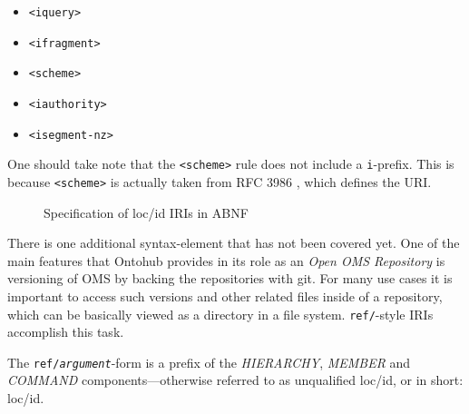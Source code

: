 \documentclass[10pt, a4paper]{isov2}
\begin{document}
\begin{itemize}
  \item \texttt{<iquery>}
  \item \texttt{<ifragment>}
  \item \texttt{<scheme>}
  \item \texttt{<iauthority>}
  \item \texttt{<isegment-nz>}
\end{itemize}

One should take note that the \texttt{<scheme>} rule does not include a
\texttt{i}-prefix.  This is because \texttt{<scheme>} is actually taken from
RFC 3986 \cite{rfc3986}, which defines the URI.

\begin{figure}[b]
  \centering
  
  \caption[loc/id specification in ABNF]
   {Specification of loc/id IRIs in ABNF}
  \label{lst:loc-id-spec}
\end{figure}

\clearpage




There is one additional syntax-element that has not been covered yet. One of the
main features that Ontohub provides in its role as an \emph{Open OMS Repository}
is versioning of OMS by backing the repositories with git. For many use cases it is 
important to access such versions and other related files inside of a
repository, which can be basically viewed as a directory in a file system.
\texttt{ref/}-style IRIs accomplish this task.

The \texttt{ref/\emph{argument}}-form is a prefix of the \emph{HIERARCHY},
\emph{MEMBER} and \emph{COMMAND} components---otherwise referred to as
unqualified loc/id, or in short: loc/id.
\end{document}
